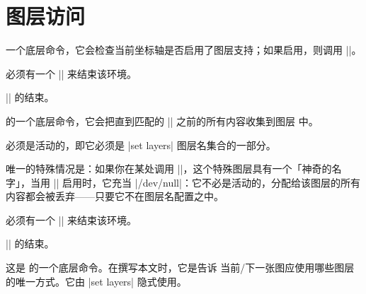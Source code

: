 \section{图层访问}

\begin{command}{\pgfplotsonlayer{}}
    一个底层命令，它会检查当前坐标轴是否启用了图层支持；如果启用，则调用 |\pgfonlayer|。

    必须有一个 |\endpgfplotsonlayer| 来结束该环境。
\end{command}

\begin{command}{\endpgfplotsonlayer}
    |\pgfplotsonlayer| 的结束。
\end{command}

\begin{command}{\pgfonlayer{}}
    \PGF{} 的一个底层命令，它会把直到匹配的 |\endpgfonlayer| 之前的所有内容收集到图层  中。

     必须是活动的，即它必须是 |set layers| 图层名集合的一部分。

    唯一的特殊情况是：如果你在某处调用 ||，这个特殊图层具有一个「神奇的名字」，当用 || 启用时，它充当 |/dev/null|：它不必是活动的，分配给该图层的所有内容都会被丢弃——只要它不在图层名配置之中。

    必须有一个 |\endpgfonlayer| 来结束该环境。
\end{command}

\begin{command}{\endpgfonlayer}
    |\pgfonlayer| 的结束。
\end{command}


\begin{command}{\pgfsetlayers{}}
    这是 \PGF{} 的一个底层命令。在撰写本文时，它是告诉 \PGF{} 当前/下一张图应使用哪些图层的唯一方式。它由 |set layers| 隐式使用。
\end{command}
